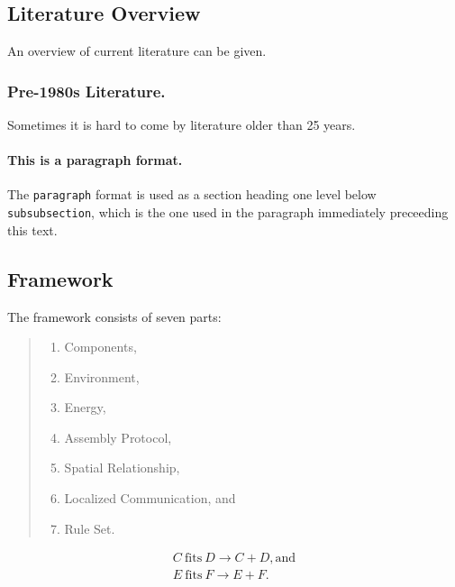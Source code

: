 \documentclass[runningheads]{llncs}
\begin{document}
\subsection{Literature Overview}
An overview of current literature can be given.

\subsubsection{Pre-1980s Literature.} 
Sometimes it is hard to come by literature older than 25 years.

\paragraph{This is a paragraph format.} The {\tt paragraph} format is used as a section heading one level below {\tt subsubsection}, which is the one used in the paragraph immediately preceeding this text.

\subsection{Framework}
\label{sec:Framework}
The framework consists of seven parts:


\begin{quote}
	\begin{enumerate}
		\item {} Components, 
		\item {} Environment, 
		\item {} Energy, 
		\item {} Assembly Protocol, 
		\item {} Spatial Relationship, 
		\item {} Localized Communication, and 
		\item {} Rule Set. 
	\end{enumerate}
\end{quote}



\begin{eqnarray} 
	C \mathrm{\ fits\ } D \rightarrow C+D\mathrm{ , and} \\
	E \mathrm{\ fits\ } F \rightarrow E+F.
\end{eqnarray}

\end{document}
